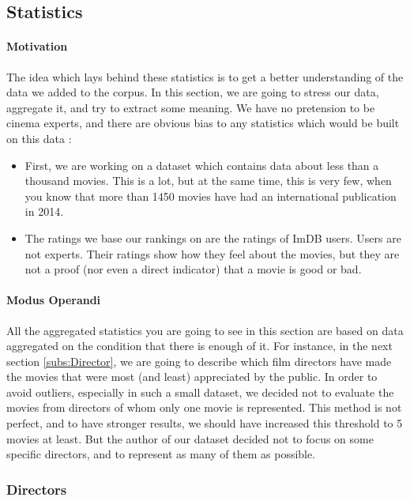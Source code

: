 \newpage
\subsection{Statistics}
\label{ssec:stats}

\paragraph{Motivation}
\label{par:Motivation}
The idea which lays behind these statistics is to get a better understanding of the data we added to the corpus.
In this section, we are going to stress our data, aggregate it, and try to extract some meaning.
We have no pretension to be cinema experts, and there are obvious bias to any statistics which would be built on this data :
\begin{itemize}
    \item First, we are working on a dataset which contains data about less than a thousand movies.
    This is a lot, but at the same time, this is very few, when you know that more than 1450 movies have had an international publication in 2014.
    \item The ratings we base our rankings on are the ratings of ImDB users. Users are not experts.
    Their ratings show how they feel about the movies, but they are not a proof (nor even a direct indicator) that a movie is good or bad.
\end{itemize}

\paragraph{Modus Operandi}
\label{par:ModusOperandi}
All the aggregated statistics you are going to see in this section are based on data aggregated on the condition that there is enough of it.
For instance, in the next section \ref{subs:Director}, we are going to describe which film directors have made the movies that were most (and least) appreciated by the public.
In order to avoid outliers, especially in such a small dataset, we decided not to evaluate the movies from directors of whom only one movie is represented.
This method is not perfect, and to have stronger results, we should have increased this threshold to 5 movies at least.
But the author of our dataset decided not to focus on some specific directors, and to represent as many of them as possible.

\subsubsection{Directors}
\label{subs:Directors}

